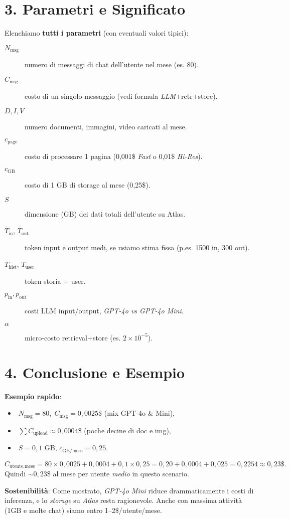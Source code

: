 \documentclass[a4paper,10pt]{article}
\begin{document}
\section*{3. Parametri e Significato}

Elenchiamo \textbf{tutti i parametri} (con eventuali valori tipici):

\begin{description}
    \item[\(N_{\text{msg}}\)] numero di messaggi di chat dell’utente nel mese (es. 80).
    \item[\(C_{\text{msg}}\)] costo di un singolo messaggio (vedi formula \emph{LLM}+retr+store).
    \item[\(D,I,V\)] numero documenti, immagini, video caricati al mese.
    \item[\(c_{\text{page}}\)] costo di processare 1 pagina (0,001\$ \emph{Fast} o 0,01\$ \emph{Hi-Res}).
    \item[\(c_{\text{GB}}\)] costo di 1 GB di storage al mese (0,25\$).
    \item[\(S\)] dimensione (GB) dei dati totali dell’utente su Atlas.
    \item[\(\bar{T}_{\text{in}}\), \(\bar{T}_{\text{out}}\)] token input e output medi, se usiamo stima fissa (p.es. 1500 in, 300 out).
    \item[\(\bar{T}_{\text{hist}}\), \(\bar{T}_{\text{user}}\)] token storia + user.
    \item[\(p_{\text{in}}, p_{\text{out}}\)] costi LLM input/output, \emph{GPT-4o vs GPT-4o Mini}.
    \item[\(\alpha\)] micro-costo retrieval+store (es. $2\times10^{-5}$).
\end{description}

\section*{4. Conclusione e Esempio}

\noindent
\textbf{Esempio rapido}:
\begin{itemize}
    \item \(\;N_{\text{msg}}=80,\;C_{\text{msg}}=0,0025\)\$ (mix GPT-4o \& Mini),
    \item \(\;\sum C_{\text{upload}} \approx 0,0004\)\$ (poche decine di doc e img),
    \item \(\;S=0,1\) GB, \(c_{\text{GB/mese}}=0,25\).
\end{itemize}
\[
C_{\text{utente,mese}}=80\times0,0025 +0,0004 +0,1\times0,25=0,20+0,0004+0,025=0,2254\approx0,23\$.
\]
Quindi \(\sim0,23\)\$ al mese per utente \emph{medio} in questo scenario.

\medskip

\textbf{Sostenibilità}:
Come mostrato, \emph{GPT-4o Mini} riduce drammaticamente i costi di inferenza, e lo \emph{storage} su \emph{Atlas} resta ragionevole. Anche con massima attività (1GB e molte chat) siamo entro 1--2\$/utente/mese.
\end{document}
